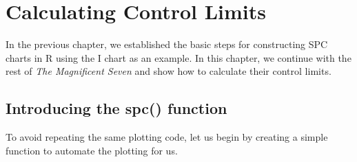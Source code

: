 \documentclass[
]{book}
\begin{document}
\chapter{Calculating Control Limits}\label{limits}

In the previous chapter, we established the basic steps for constructing SPC charts in R using the I chart as an example. In this chapter, we continue with the rest of \emph{The Magnificent Seven} and show how to calculate their control limits.

\section{Introducing the spc() function}\label{introducing-the-spc-function}

To avoid repeating the same plotting code, let us begin by creating a simple function to automate the plotting for us.
\end{document}
